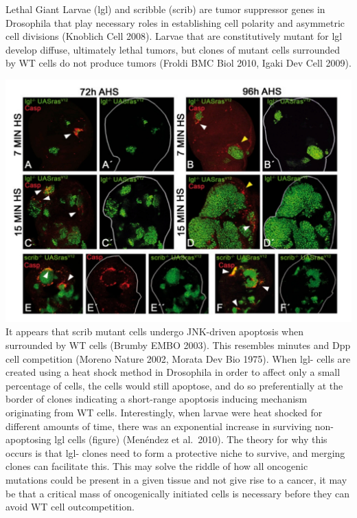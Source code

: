\documentclass[]{book}
\newenvironment{Shaded}{\begin{snugshade}}{\end{snugshade}}
\newcommand{\DataTypeTok}[1]{\textcolor[rgb]{0.13,0.29,0.53}{#1}}
\newcommand{\DecValTok}[1]{\textcolor[rgb]{0.00,0.00,0.81}{#1}}
\newcommand{\KeywordTok}[1]{\textcolor[rgb]{0.13,0.29,0.53}{\textbf{#1}}}
\newcommand{\NormalTok}[1]{#1}
\newcommand{\OperatorTok}[1]{\textcolor[rgb]{0.81,0.36,0.00}{\textbf{#1}}}
\newcommand{\OtherTok}[1]{\textcolor[rgb]{0.56,0.35,0.01}{#1}}
\newcommand{\StringTok}[1]{\textcolor[rgb]{0.31,0.60,0.02}{#1}}
\begin{document}
Lethal Giant Larvae (lgl) and scribble (scrib) are tumor suppressor genes in Drosophila that play necessary roles in establishing cell polarity and asymmetric cell divisions (Knoblich Cell 2008). Larvae that are constitutively mutant for lgl develop diffuse, ultimately lethal tumors, but clones of mutant cells surrounded by WT cells do not produce tumors (Froldi BMC Biol 2010, Igaki Dev Cell 2009).

\begin{Shaded}
\end{Shaded}

\includegraphics{images/04-3.jpg}
It appears that scrib mutant cells undergo JNK-driven apoptosis when surrounded by WT cells (Brumby EMBO 2003). This resembles minutes and Dpp cell competition (Moreno Nature 2002, Morata Dev Bio 1975). When lgl- cells are created using a heat shock method in Drosophila in order to affect only a small percentage of cells, the cells would still apoptose, and do so preferentially at the border of clones indicating a short-range apoptosis inducing mechanism originating from WT cells. Interestingly, when larvae were heat shocked for different amounts of time, there was an exponential increase in surviving non-apoptosing lgl cells (figure) (Menéndez et al.~2010). The theory for why this occurs is that lgl- clones need to form a protective niche to survive, and merging clones can facilitate this. This may solve the riddle of how all oncogenic mutations could be present in a given tissue and not give rise to a cancer, it may be that a critical mass of oncogenically initiated cells is necessary before they can avoid WT cell outcompetition.
\end{document}
